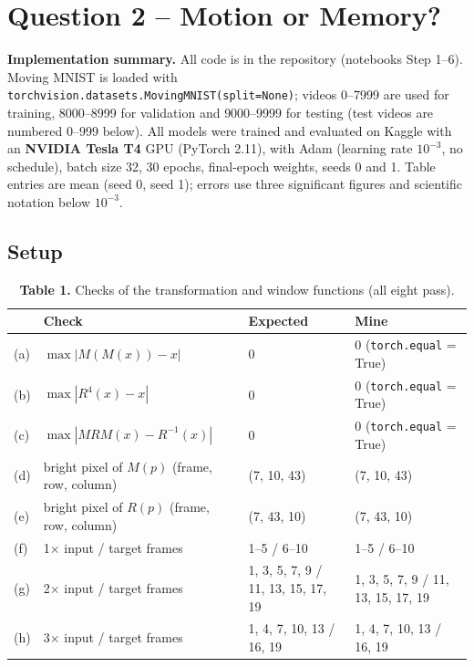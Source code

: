 \section{Question 2 -- Motion or Memory?}

\textbf{Implementation summary.} All code is in the repository (notebooks Step 1--6). Moving MNIST is loaded with \texttt{torchvision.datasets.MovingMNIST(split=None)}; videos 0--7999 are used for training, 8000--8999 for validation and 9000--9999 for testing (test videos are numbered 0--999 below). All models were trained and evaluated on Kaggle with an \textbf{NVIDIA Tesla T4} GPU (PyTorch 2.11), with Adam (learning rate $10^{-3}$, no schedule), batch size 32, 30 epochs, final-epoch weights, seeds 0 and 1. Table entries are mean (seed 0, seed 1); errors use three significant figures and scientific notation below $10^{-3}$.

\subsection{Setup}

\begin{table}[H]
\centering\footnotesize
\begin{tabular}{@{}llll@{}}
\toprule
& \textbf{Check} & \textbf{Expected} & \textbf{Mine}\\
\midrule
(a) & $\max|M(M(x))-x|$ & 0 & 0 \;(\texttt{torch.equal} = True)\\
(b) & $\max|R^4(x)-x|$ & 0 & 0 \;(\texttt{torch.equal} = True)\\
(c) & $\max|MRM(x)-R^{-1}(x)|$ & 0 & 0 \;(\texttt{torch.equal} = True)\\
(d) & bright pixel of $M(p)$ (frame, row, column) & (7, 10, 43) & (7, 10, 43)\\
(e) & bright pixel of $R(p)$ (frame, row, column) & (7, 43, 10) & (7, 43, 10)\\
(f) & 1$\times$ input / target frames & 1--5 / 6--10 & 1--5 / 6--10\\
(g) & 2$\times$ input / target frames & 1, 3, 5, 7, 9 / 11, 13, 15, 17, 19 & 1, 3, 5, 7, 9 / 11, 13, 15, 17, 19\\
(h) & 3$\times$ input / target frames & 1, 4, 7, 10, 13 / 16, 19 & 1, 4, 7, 10, 13 / 16, 19\\
\bottomrule
\end{tabular}
\caption*{\textbf{Table 1.} Checks of the transformation and window functions (all eight pass).}
\end{table}

